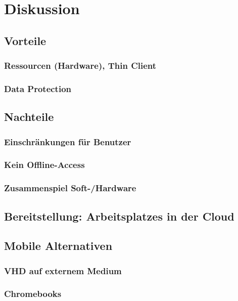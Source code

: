 
\chapter{Diskussion}


\section{Vorteile}
\subsection{Ressourcen (Hardware), Thin Client}

\subsection{Data Protection}

\section{Nachteile}

\subsection{Einschränkungen für Benutzer}
\subsection{Kein Offline-Access}
\subsection{Zusammenspiel Soft-/Hardware}



\section{Bereitstellung: Arbeitsplatzes in der Cloud}



\section{Mobile Alternativen}

\subsection{VHD auf externem Medium}

\subsection{Chromebooks}
